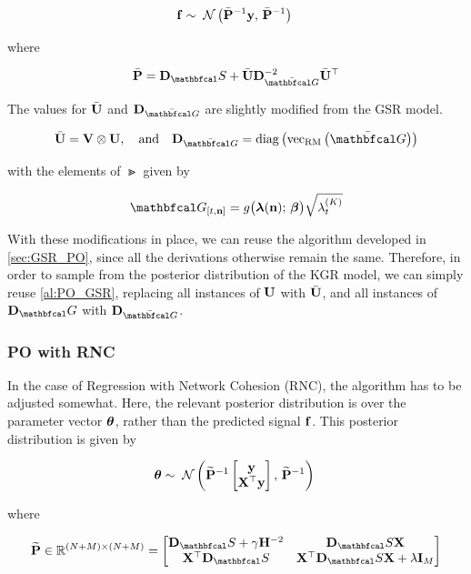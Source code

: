 \begin{equation}
    \mathbf{f} \sim \; \mathcal{N}\left(\bar{\mathbf{P}}^{-1} \mathbf{y}, \, \bar{\mathbf{P}}^{-1}\right) \;
\end{equation}

where 

\begin{equation}
    \bar{\PP} = \D_\St + \bar{\U} \D_{\bar{\Gt}}^{-2} \bar{\U}^\top
\end{equation}

The values for $\bar{\mathbf{U}}$ and $\D_{\bar{\Gt}}$ are slightly modified from the GSR model. 

\begin{equation}
    \bar{\U} = \V \otimes \U, \aand \D_{\bar{\Gt}} = \diag{\vecrm{\bar{\Gt}}}
\end{equation}

with the elements of $\Gt$ given by 

\begin{equation}
    \Gt_{[t, \nn]} = g\big(\lambdaa(\nn); \, \betaa\big) \sqrt{\lambda^{(K)}_t} 
\end{equation}

With these modifications in place, we can reuse the algorithm developed in \cref{sec:GSR_PO}, since all the derivations otherwise remain the same. Therefore, in order to sample from the posterior distribution of the KGR model, we can simply reuse \cref{al:PO_GSR}, replacing all instances of $\mathbf{U}$ with $\bar{\mathbf{U}}$, and all instances of $\D_\Gt$ with $\D_{\bar{\Gt}}$. 

\subsubsection{PO with RNC}

In the case of Regression with Network Cohesion (RNC), the algorithm has to be adjusted somewhat. Here, the relevant posterior distribution is over the parameter vector $\boldsymbol{\theta}$, rather than the predicted signal $\mathbf{f}$. This posterior distribution is given by 

\begin{equation}
    \boldsymbol{\theta} \sim \; \mathcal{N}\left(\widetilde{\mathbf{P}}^{-1} \begin{bmatrix} \mathbf{y} \\ \mathbf{X}^\top \mathbf{y} \end{bmatrix}, \, \widetilde{\mathbf{P}}^{-1}\right) \;
\end{equation}

where 

\begin{equation}
    \widetilde{\PP} \in \R^{(N + M) \times (N + M)}= 
    \begin{bmatrix}
     \D_\St + \gamma \HH^{-2} & \D_\St  \X \\
     \X^\top \D_\St & \X^\top \D_\St \X + \lambda \I_M   
    \end{bmatrix}
\end{equation}

